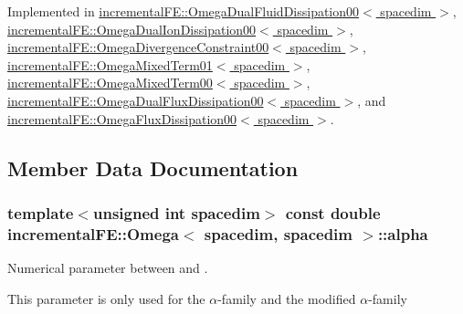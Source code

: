 Implemented in \hyperlink{classincremental_f_e_1_1_omega_dual_fluid_dissipation00_a505f97cabdd9375fe76b714c28088ca6}{incremental\+F\+E\+::\+Omega\+Dual\+Fluid\+Dissipation00$<$ spacedim $>$}, \hyperlink{classincremental_f_e_1_1_omega_dual_ion_dissipation00_a0222bc5e8dfcc93728c230c604439332}{incremental\+F\+E\+::\+Omega\+Dual\+Ion\+Dissipation00$<$ spacedim $>$}, \hyperlink{classincremental_f_e_1_1_omega_divergence_constraint00_a56323a14c158f9008621a9a5d77f1be8}{incremental\+F\+E\+::\+Omega\+Divergence\+Constraint00$<$ spacedim $>$}, \hyperlink{classincremental_f_e_1_1_omega_mixed_term01_a6fe47df6c774ba07cb3455616997dfe7}{incremental\+F\+E\+::\+Omega\+Mixed\+Term01$<$ spacedim $>$}, \hyperlink{classincremental_f_e_1_1_omega_mixed_term00_abf975855eb0155318ad152e7fbac11d1}{incremental\+F\+E\+::\+Omega\+Mixed\+Term00$<$ spacedim $>$}, \hyperlink{classincremental_f_e_1_1_omega_dual_flux_dissipation00_a27833d3c88054ddf2231a32c6c6b2d2d}{incremental\+F\+E\+::\+Omega\+Dual\+Flux\+Dissipation00$<$ spacedim $>$}, and \hyperlink{classincremental_f_e_1_1_omega_flux_dissipation00_a7b9ccca9346b229a5e7f4f2254d932ec}{incremental\+F\+E\+::\+Omega\+Flux\+Dissipation00$<$ spacedim $>$}.



\subsection{Member Data Documentation}
\subsubsection[{\texorpdfstring{alpha}{alpha}}]{\setlength{\rightskip}{0pt plus 5cm}template$<$unsigned int spacedim$>$ const double {\bf incremental\+F\+E\+::\+Omega}$<$ spacedim, spacedim $>$\+::alpha\hspace{0.3cm}{\ttfamily [private]}}\hypertarget{classincremental_f_e_1_1_omega_3_01spacedim_00_01spacedim_01_4_ad881c36804cc027c301f4f069756c2db}{}\label{classincremental_f_e_1_1_omega_3_01spacedim_00_01spacedim_01_4_ad881c36804cc027c301f4f069756c2db}
Numerical parameter between {} and {}.

This parameter is only used for the $\alpha$-\/family and the modified $\alpha$-\/family 
